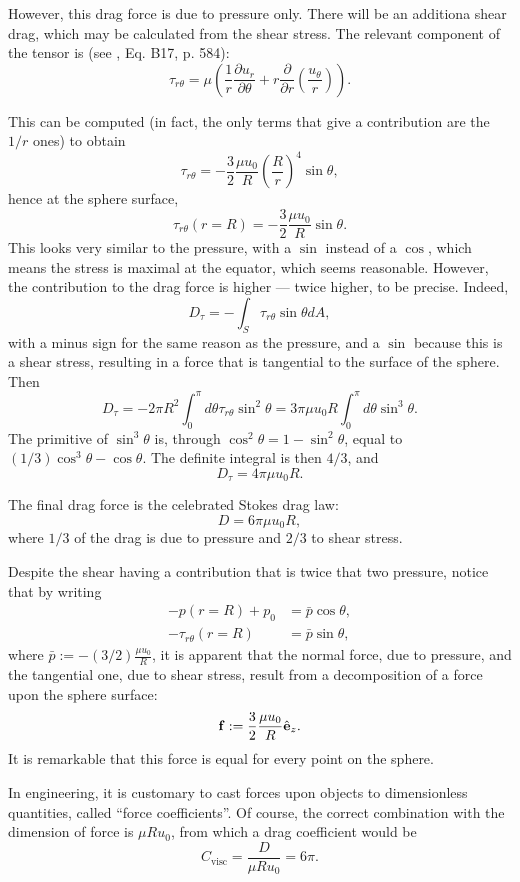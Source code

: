 However, this drag force is due to pressure only. There will be an
additiona shear drag, which may be calculated from the shear stress.
The relevant component of the tensor is (see \cite{white1991viscous},
Eq. B17, p. 584):
\[
  \tau_{r\theta} = \mu \left(
    \frac1r
    \frac{\partial u_r}{\partial \theta} +
    r \frac{\partial }{\partial r} \left( \frac{u_\theta}{r}\right) 
  \right) .
\]

This can be computed (in fact, the only terms that give a contribution
are the $1/r$ ones) to obtain
\[
  \tau_{r\theta} = 
  - \frac32 \frac{\mu u_0}{R} \left(\frac{R}{r}\right)^4 \sin\theta ,
\]
hence at the sphere surface,
\[
  \tau_{r\theta} (r=R) =  - \frac32 \frac{\mu u_0}{R}  \sin\theta .
\]
This looks very similar to the pressure, with a $\sin$ instead of a
$\cos$, which means the stress is maximal at the equator, which seems
reasonable. However, the contribution to the drag force is higher ---
twice higher, to be precise. Indeed,
\[
  D_\tau =  - \int_S  \tau_{r\theta} \sin\theta dA ,
\]
with a minus sign for the same reason as the pressure, and a $\sin$
because this is a shear stress, resulting in a force that is
tangential to the surface of the sphere.  Then
\[
  D_\tau =
  - 2\pi R^2 \int_0^\pi d\theta   \tau_{r\theta} \sin^2\theta  =
  3 \pi \mu u_0 R  \int_0^\pi d\theta \sin^3\theta .
\]
The primitive of $\sin^3\theta$ is, through
$\cos^2\theta=1-\sin^2\theta$, equal to
$(1/3) \cos^3\theta - \cos\theta$. The definite integral is then $4/3$, and
\[
  D_\tau = 4 \pi \mu u_0 R .
\]

The final drag force is the celebrated Stokes drag law: 
\[
  D = 6 \pi \mu u_0 R ,
\]
where $1/3$ of the drag is due to pressure and $2/3$ to shear stress.

Despite the shear having a contribution that is twice that two
pressure, notice that by writing 
\begin{align*}
  - p(r=R) + p_0 &= \bar{p} \cos\theta,  \\
  -\tau_{r\theta} (r=R) &= \bar{p} \sin\theta,  
\end{align*}
where $\bar{p} := - (3/2) \frac{\mu u_0}{R}$, it is apparent that the
normal force, due to pressure, and the tangential one, due to shear
stress, result from a decomposition of a force upon the sphere surface:
\[
  \mathbf{f} := \frac32 \frac{\mu u_0}{R} \hat{\mathbf{e}}_z .
\]
It is remarkable that this force is equal for every point on the
sphere.

In engineering, it is customary to cast forces upon objects to
dimensionless quantities, called ``force coefficients''.  Of course, the correct combination with the dimension
of force is $\mu R u_0$, from which a drag coefficient would be
\[
  C_\mathrm{visc} = \frac{ D }{ \mu R u_0 } = 6\pi .
\]

